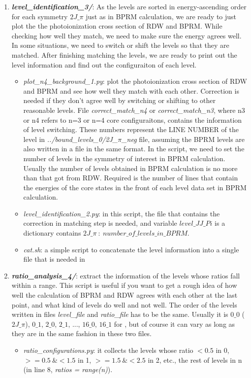 \begin{enumerate}
	\item \textbf{\textit{level\_identification\_3/}}: As the levels are sorted in energy-ascending order for each symmetry $2J\_\pi$ just as in BPRM calculation, we are ready to just plot the the photoionization cross section of RDW and BPRM. While checking how well they match, we need to make sure the energy agrees well. In some situations, we need to switch or shift the levels so that they are matched. After finishing matching the levels, we are ready to print out the level information and find out the configuraiton of each level.
		\begin{itemize}
			\item \textit{plot\_n4\_background\_1.py}: plot the photoionization cross section of RDW and BPRM and see how well they match with each other. Correction is needed if they don't agree well by switching or shifting to other reasonable levels. File \textit{correct\_match\_n4} or \textit{correct\_match\_n3}, where n3 or n4 refers to n=3 or n=4 core configuraitons, contains the information of level switching. These numbers represent the LINE NUMBER of the level in \textit{../bound\_levels\_0/2J\_$\pi$\_neg} file, assuming the BPRM levels are also written in a file in the same format. In the script, we need to set the number of levels in the symmetry of interest in BPRM calculation. Usually the number of levels obtained in BPRM calculation is no more than that got from RDW. Required is the number of lines that contain the energies of the core states in the front of each level data set in BPRM calculation.
			\item \textit{level\_identification\_2.py}: in this script, the file that contains the correction in matching step is needed, and variable $level\_JJ\_Pi$ is a dictionary contains $2J\_\pi~:~number\_of\_levels\_in\_BPRM$.
			\item \textit{cat.sh}: a simple script to concatenate the level information into a single file that is needed in 
		\end{itemize}
	
	\item \textbf{\textit{ratio\_analysis\_4/}}: extract the information of the levels whose ratios fall within a range. This script is useful if you want to get a rough idea of how well the calculation of BPRM and RDW agrees with each other at the last point, and what kind of levels do well and not well. The order of the levels written in files \textit{level\_file} and \textit{ratio\_file} has to be the same. Usually it is $0\_0$ ($2J\_\pi$), $0\_1$, $2\_0$, $2\_1$, ..., $16\_0$, $16\_1$ for , but of course it can vary as long as they are in the same fashion in these two files.
	\begin{itemize}
		\item \textit{ratio\_configurations.py}: it collects the levels whose ratio $<0.5$ in 0, $>=0.5~\&<1.5$ in 1, $>=1.5~\&<2.5$ in 2, etc., the rest of levels in n (in line 8, \colorbox{gray!20}{\textit{ratios = range(n)}}).
	\end{itemize}
	

\end{enumerate}
